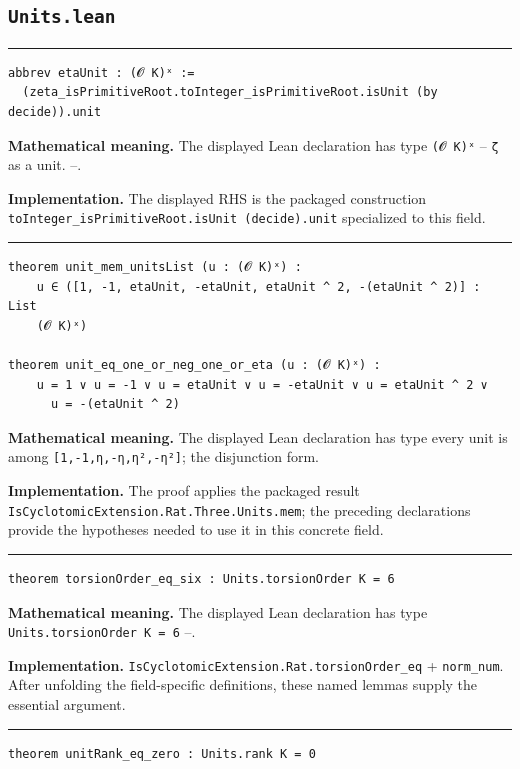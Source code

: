 \documentclass[UTF8,a4paper,11pt,fontset=fandol]{ctexart}
\theoremstyle{definition}
\newcommand{\statementsep}{\par\medskip\hrule\medskip}
\begin{document}
\subsection{\texttt{Units.lean}}

\statementsep
\begin{verbatim}
abbrev etaUnit : (𝓞 K)ˣ :=
  (zeta_isPrimitiveRoot.toInteger_isPrimitiveRoot.isUnit (by decide)).unit
\end{verbatim}
\noindent\textbf{Mathematical meaning.} The displayed Lean declaration has type \texttt{(𝓞 K)ˣ} -- \texttt{ζ} as a unit. --.\par
\noindent\textbf{Implementation.} The displayed RHS is the packaged construction \texttt{toInteger\_\allowbreak{}isPrimitiveRoot.\allowbreak{}isUnit (decide).\allowbreak{}unit} specialized to this field.\par
\statementsep
\begin{verbatim}
theorem unit_mem_unitsList (u : (𝓞 K)ˣ) :
    u ∈ ([1, -1, etaUnit, -etaUnit, etaUnit ^ 2, -(etaUnit ^ 2)] : List
    (𝓞 K)ˣ)

theorem unit_eq_one_or_neg_one_or_eta (u : (𝓞 K)ˣ) :
    u = 1 ∨ u = -1 ∨ u = etaUnit ∨ u = -etaUnit ∨ u = etaUnit ^ 2 ∨
      u = -(etaUnit ^ 2)
\end{verbatim}
\noindent\textbf{Mathematical meaning.} The displayed Lean declaration has type every unit is among \texttt{[1,-1,η,-η,η²,-η²]}; the disjunction form.\par
\noindent\textbf{Implementation.} The proof applies the packaged result \texttt{IsCyclotomicExtension.\allowbreak{}Rat.\allowbreak{}Three.\allowbreak{}Units.\allowbreak{}mem}; the preceding declarations provide the hypotheses needed to use it in this concrete field.\par
\statementsep
\begin{verbatim}
theorem torsionOrder_eq_six : Units.torsionOrder K = 6
\end{verbatim}
\noindent\textbf{Mathematical meaning.} The displayed Lean declaration has type \texttt{Units.\allowbreak{}torsionOrder K = 6} --.\par
\noindent\textbf{Implementation.} \texttt{IsCyclotomicExtension.\allowbreak{}Rat.\allowbreak{}torsionOrder\_\allowbreak{}eq} + \texttt{norm\_\allowbreak{}num}. After unfolding the field-specific definitions, these named lemmas supply the essential argument.\par
\statementsep
\begin{verbatim}
theorem unitRank_eq_zero : Units.rank K = 0
\end{verbatim}
\end{document}
